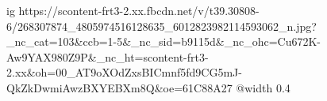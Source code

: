  
 
 
 
 

\ifcmt
  ig https://scontent-frt3-2.xx.fbcdn.net/v/t39.30808-6/268307874_4805974516128635_6012823982114593062_n.jpg?_nc_cat=103&ccb=1-5&_nc_sid=b9115d&_nc_ohc=Cu672K-Aw9YAX980Z9P&_nc_ht=scontent-frt3-2.xx&oh=00_AT9oXOdZxsBICmnf5fd9CG5mJ-QkZkDwmiAwzBXYEBXm8Q&oe=61C88A27
  @width 0.4
\fi
